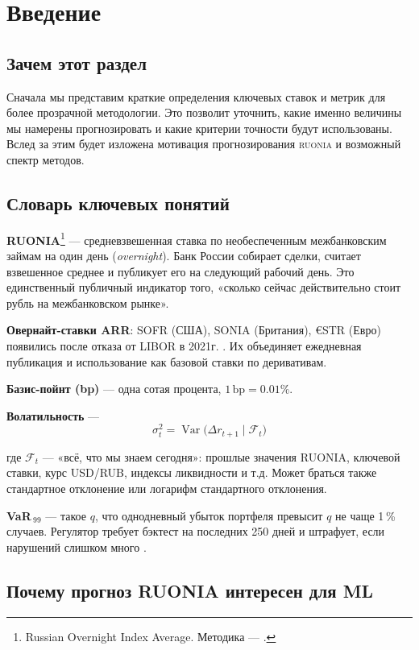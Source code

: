 \section{Введение}
\subsection*{Зачем этот раздел}     
Сначала мы представим краткие определения ключевых ставок и метрик для более прозрачной методологии. 
Это позволит уточнить, какие именно величины мы намерены прогнозировать 
и какие критерии точности будут использованы. 
Вслед за этим будет изложена мотивация прогнозирования
\textsc{ruonia} и возможный спектр методов.

\subsection{Словарь ключевых понятий}

\textbf{RUONIA}\footnote{Russian Overnight Index Average. Методика — \autocite{cbr_method2024}.} —
средневзвешенная ставка по необеспеченным межбанковским займам на один
день (\emph{overnight}). Банк России собирает сделки, считает
взвешенное среднее и публикует его на следующий рабочий день. Это
единственный публичный индикатор того, «сколько сейчас действительно стоит рубль
на межбанковском рынке».

\textbf{Овернайт-ставки ARR}:  
SOFR (США), SONIA (Британия), €STR (Евро) появились после
отказа от LIBOR в 2021г. \autocite{arrc2021}. Их объединяет ежедневная
публикация и использование как базовой ставки по деривативам.

\textbf{Базис-пойнт (bp)} — одна сотая процента, $1\,\text{bp}=0.01\%$.

\textbf{Волатильность} —
\[
\sigma_t^{2}= \operatorname{Var}\bigl(\Delta r_{t+1}\mid\mathcal F_t\bigr)
\]

где $\mathcal F_t$ — «всё, что мы знаем сегодня»: прошлые значения
RUONIA, ключевой ставки, курс USD/RUB, индексы ликвидности и т.д. 
Может браться также стандартное отклонение или логарифм стандартного отклонения.

\textbf{VaR\,$_{99}$} — такое $q$, что однодневный убыток портфеля
превысит $q$ не чаще 1 \% случаев. Регулятор требует бэктест
на последних 250 дней и штрафует, если нарушений слишком много
\autocite{basel2023}.

\subsection{Почему прогноз RUONIA интересен для ML}

